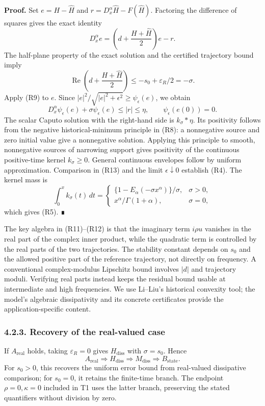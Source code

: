 \documentclass[a4paper,11pt]{article}
\begin{document}
\textbf{Proof.} Set \(e=H-\widehat H\) and \(r=D_x^\alpha\widehat H-F(\widehat H)\). Factoring the difference of squares gives the exact identity
\[
D_x^\alpha e=\left(d+\frac{H+\widehat H}{2}\right)e-r.
\tag{R11}
\]
The half-plane property of the exact solution and the certified trajectory bound imply
\[
\operatorname{Re}\left(d+\frac{H+\widehat H}{2}\right)
\le-s_0+\varepsilon_R/2=-\sigma.
\tag{R12}
\]
Apply (R9) to \(e\). Since
\( |e|^2/\sqrt{|e|^2+\epsilon^2}\ge\psi_\epsilon(e)\), we obtain
\[
D_x^\alpha\psi_\epsilon(e)+\sigma\psi_\epsilon(e)\le |r|\le\eta,
\qquad \psi_\epsilon(e(0))=0.
\tag{R13}
\]
The scalar Caputo solution with the right-hand side is \(k_\sigma*\eta\). Its positivity follows from the negative historical-minimum principle in (R8): a nonnegative source and zero initial value give a nonnegative solution. Applying this principle to smooth, nonnegative sources of narrowing support gives positivity of the continuous positive-time kernel \(k_\sigma\ge0\). General continuous envelopes follow by uniform approximation. Comparison in (R13) and the limit \(\epsilon\downarrow0\) establish (R4). The kernel mass is
\[
\int_0^xk_\sigma(t)\,dt=
\begin{cases}
\{1-E_\alpha(-\sigma x^\alpha)\}/\sigma,&\sigma>0,\\
x^\alpha/\Gamma(1+\alpha),&\sigma=0,
\end{cases}
\]
which gives (R5). ∎

The key algebra in (R11)–(R12) is that the imaginary term \(i\rho u\) vanishes in the real part of the complex inner product, while the quadratic term is controlled by the real parts of the two trajectories. The stability constant depends on \(s_0\) and the allowed positive part of the reference trajectory, not directly on frequency. A conventional complex-modulus Lipschitz bound involves \(|d|\) and trajectory moduli. Verifying real parts instead keeps the residual bound usable at intermediate and high frequencies. We use Li–Liu's historical convexity tool; the model's algebraic dissipativity and its concrete certificates provide the application-specific content.

\subsubsection*{4.2.3. Recovery of the real-valued case}

If \(A_{\mathrm{real}}\) holds, taking \(\varepsilon_R=0\) gives \(H_{\mathrm{diss}}\) with \(\sigma=s_0\). Hence
\[
A_{\mathrm{real}}\Rightarrow H_{\mathrm{diss}}
\Rightarrow M_{\mathrm{diss}}\Rightarrow B_{\mathrm{state}}.
\tag{R14}
\]
For \(s_0>0\), this recovers the uniform error bound from real-valued dissipative comparison; for \(s_0=0\), it retains the finite-time branch. The endpoint \(\rho=0,\kappa=0\) included in T1 uses the latter branch, preserving the stated quantifiers without division by zero.
\end{document}
